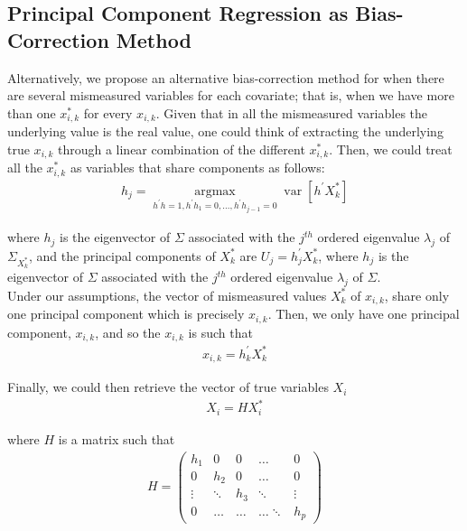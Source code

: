 \documentclass[12pt]{article}
\begin{document}
    \subsection*{Principal Component Regression as Bias-Correction Method}

        Alternatively, we propose an alternative bias-correction method for when there are several mismeasured variables for each covariate; that is, when we have more than one $x_{i,k}^*$ for every $x_{i,k}$. Given that in all the mismeasured variables the underlying value is the real value, one could think of extracting the underlying true $x_{i,k}$ through a linear combination of the different $x_{i,k}^*$. Then, we could treat all the $x_{i,k}^*$ as variables that share components as follows:
        \begin{align}
        h_{j}=\underset{h^{\prime} h=1, h^{\prime} h_{1}=0, \ldots, h^{\prime} h_{j-1}=0}{\operatorname{argmax}} \operatorname{var}\left[h^{\prime} X^*_k\right]  
        \end{align}


        where $h_j$ is the eigenvector of $\Sigma$ associated with the $j^{t h}$ ordered eigenvalue $\lambda_{j}$ of $\Sigma_{X^*_k}$, and the principal components of $X^*_k$ are $U_{j}=h_{j}^{\prime} X^*_k$, where $h_{j}$ is the eigenvector of $\Sigma$ associated with the $j^{t h}$ ordered eigenvalue $\lambda_{j}$ of $\Sigma$.\\

        Under our assumptions, the vector of mismeasured values $X^*_k$ of $x_{i,k}$, share only one principal component which is precisely $x_{i,k}$. Then, we only have one principal component, $x_{i,k}$, and so the $x_{i,k}$ is such that
        \begin{align}
            x_{i,k}=h_{k}^{\prime} X^*_k
        \end{align}

        Finally, we could then retrieve the vector of true variables $X_i$
        \begin{align}
            X_i=HX^*_i
        \end{align}

        where $H$ is a matrix such that
        \begin{align*}
            H=\left(\begin{array}{ccccc}
            h_1 & 0 & 0 & \dots & 0 \\
            0 & h_2 & 0 & \dots & 0 \\
            \vdots & \ddots & h_3 & \ddots & \vdots \\
            0 & \dots & \dots & \dots \ddots & h_p
            \end{array}\right)
        \end{align*}
\end{document}

